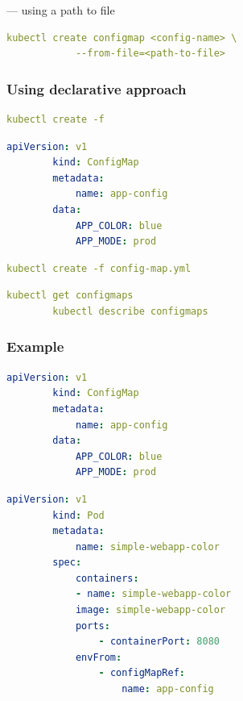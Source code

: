\documentclass[11pt]{book}
\begin{document}
    --- using a path to file

    \begin{lstlisting}[language=yaml, caption={Example pod definition file with yml}]
        kubectl create configmap <config-name> \
            --from-file=<path-to-file>
    \end{lstlisting}

    \subsubsection{Using declarative approach}
    \begin{lstlisting}[language=yaml, caption={Example pod definition file with yml}]
        kubectl create -f
    \end{lstlisting}

    \begin{lstlisting}[language=yaml, caption={Example pod definition file with yml}]
        apiVersion: v1
        kind: ConfigMap
        metadata:
            name: app-config
        data:
            APP_COLOR: blue
            APP_MODE: prod
    \end{lstlisting}

    \begin{lstlisting}[language=yaml, caption={Example pod definition file with yml}]
        kubectl create -f config-map.yml
    \end{lstlisting}

    \begin{lstlisting}[language=yaml, caption={Viewing config maps}]
        kubectl get configmaps
        kubectl describe configmaps
    \end{lstlisting}

    \subsubsection{Example}
    \begin{lstlisting}[language=yaml, caption={Example pod definition file with yml}]
        apiVersion: v1
        kind: ConfigMap
        metadata:
            name: app-config
        data:
            APP_COLOR: blue
            APP_MODE: prod
    \end{lstlisting}

    \begin{lstlisting}[language=yaml, caption={Example pod definition file with yml}]
        apiVersion: v1
        kind: Pod
        metadata:
            name: simple-webapp-color
        spec:
            containers:
            - name: simple-webapp-color
            image: simple-webapp-color
            ports:
                - containerPort: 8080
            envFrom:
                - configMapRef:
                    name: app-config
    \end{lstlisting}
\end{document}
